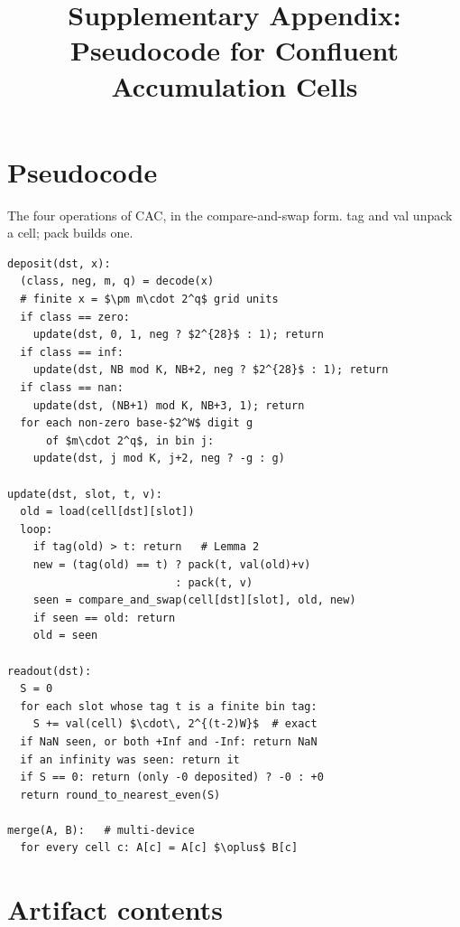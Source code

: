 \documentclass[journal]{IEEEtran}
\begin{document}
\title{Supplementary Appendix: Pseudocode for Confluent Accumulation Cells}
\author{
}
\maketitle
\appendix

\hypertarget{pseudocode}{%
\section{Pseudocode}\label{pseudocode}}

The four operations of CAC, in the compare-and-swap form. tag and val
unpack a cell; pack builds one.

\begin{lstlisting}
deposit(dst, x):
  (class, neg, m, q) = decode(x)
  # finite x = $\pm m\cdot 2^q$ grid units
  if class == zero:
    update(dst, 0, 1, neg ? $2^{28}$ : 1); return
  if class == inf:
    update(dst, NB mod K, NB+2, neg ? $2^{28}$ : 1); return
  if class == nan:
    update(dst, (NB+1) mod K, NB+3, 1); return
  for each non-zero base-$2^W$ digit g
      of $m\cdot 2^q$, in bin j:
    update(dst, j mod K, j+2, neg ? -g : g)

update(dst, slot, t, v):
  old = load(cell[dst][slot])
  loop:
    if tag(old) > t: return   # Lemma 2
    new = (tag(old) == t) ? pack(t, val(old)+v)
                          : pack(t, v)
    seen = compare_and_swap(cell[dst][slot], old, new)
    if seen == old: return
    old = seen

readout(dst):
  S = 0
  for each slot whose tag t is a finite bin tag:
    S += val(cell) $\cdot\, 2^{(t-2)W}$  # exact
  if NaN seen, or both +Inf and -Inf: return NaN
  if an infinity was seen: return it
  if S == 0: return (only -0 deposited) ? -0 : +0
  return round_to_nearest_even(S)

merge(A, B):   # multi-device
  for every cell c: A[c] = A[c] $\oplus$ B[c]
\end{lstlisting}

\hypertarget{artifact-contents}{%
\section{Artifact contents}\label{artifact-contents}}
\end{document}
